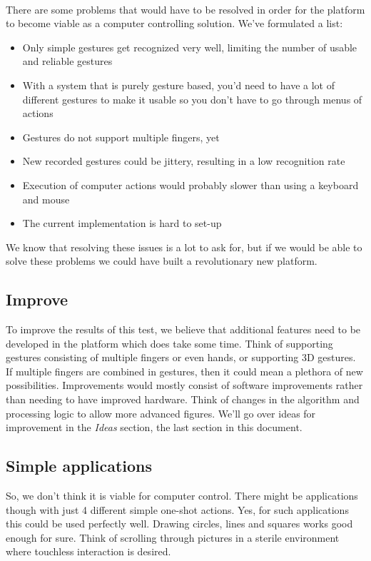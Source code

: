 \documentclass[a4paper]{article}
\providecommand{\tightlist}{%
\setlength{\itemsep}{0pt}\setlength{\parskip}{0pt}}
\begin{document}
  \paragraph{}
  There are some problems that would have to be resolved in order for the
  platform to become viable as a computer controlling solution. We've formulated
  a list:

  \begin{itemize}
    \tightlist
    \item Only simple gestures get recognized very well, limiting the number of
      usable and reliable gestures
    \item With a system that is purely gesture based, you'd need to have a lot
      of different gestures to make it usable so you don't have to go through
      menus of actions
    \item Gestures do not support multiple fingers, yet
    \item New recorded gestures could be jittery, resulting in a low recognition
      rate
    \item Execution of computer actions would probably slower than using a
      keyboard and mouse
    \item The current implementation is hard to set-up
  \end{itemize}

  We know that resolving these issues is a lot to ask for, but if we would be able to solve these
  problems we could have built a revolutionary new platform.

  \subsection{Improve}
  To improve the results of this test, we believe that additional features need
  to be developed in the platform which does take some time. Think of supporting
  gestures consisting of multiple fingers or even hands, or supporting 3D
  gestures. If multiple fingers are combined in gestures, then it could mean a
  plethora of new possibilities. Improvements would mostly consist of software improvements rather
  than needing to have improved hardware. Think of changes in the algorithm and
  processing logic to allow more advanced figures. We'll go over ideas for
  improvement in the \emph{Ideas} section, the last section in this document.

  \subsection{Simple applications}
  So, we don't think it is viable for computer control. There might be
  applications though with just 4 different simple one-shot actions.
  Yes, for such applications this could be used perfectly well. Drawing circles,
  lines and squares works good enough for sure. Think of scrolling through
  pictures in a sterile environment where touchless interaction is desired.
\end{document}
